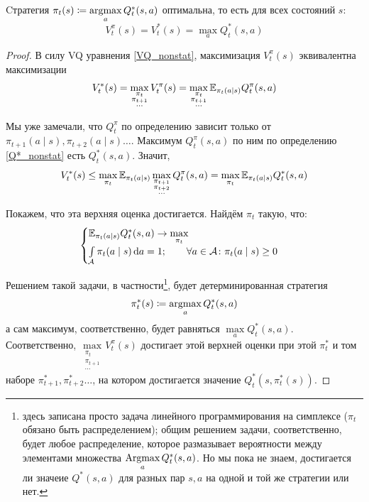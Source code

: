 \begin{theoremBox}[label=th:nonstatbellmancriterion]{}
Cтратегия $\pi_t(s) \coloneqq \mathop{\mathrm{argmax}}\limits_{a} Q^*_t(s, a)$ оптимальна, то есть для всех состояний $s$:
\begin{equation}\label{V*Q*_nonstat}
V^\pi_t(s) = V^*_t(s) = \max_{a} Q^*_t(s, a)
\end{equation}
\begin{proof}
В силу VQ уравнения \eqref{VQ_nonstat}, максимизация $V^{\pi}_t(s)$ эквивалентна максимизации
$$V^*_t(s) = \max_{\substack{\pi_t \\ \pi_{t+1} \\ \cdots}} V^\pi_t(s) = \max_{\substack{\pi_t \\ \pi_{t+1} \\ \cdots}} \mathbb{E}_{\pi_t(a \mid s)} Q^\pi_t(s, a)$$

Мы уже замечали, что $Q^\pi_t$ по определению зависит только от $\pi_{t+1}(a \mid s), \pi_{t+2}(a \mid s) \dots$. Максимум $Q^\pi_t(s, a)$ по ним по определению \eqref{Q*_nonstat} есть $Q^*_t(s, a)$. Значит,
$$V^*_t(s) \le \max_{\pi_t} \mathbb{E}_{\pi_t(a \mid s)} \max_{\substack{\pi_{t+1} \\ \pi_{t+2} \\ \cdots}} Q^\pi_t(s, a) = \max_{\pi_t} \mathbb{E}_{\pi_t(a \mid s)} Q^*_t(s, a)$$

Покажем, что эта верхняя оценка достигается. Найдём $\pi_t$ такую, что:
$$
\begin{cases}
\mathbb{E}_{\pi_t(a \mid s)} Q^*_t(s, a) \to \max\limits_{\pi_t} \\
\int\limits_{\mathcal{A}} \pi_t(a \mid s) \mathop{}\!\mathrm{d} a = 1; \qquad \forall a \in \mathcal{A} \colon \pi_t(a \mid s) \ge 0
\end{cases}
$$

Решением такой задачи, в частности\footnote{здесь записана просто задача линейного программирования на симплексе ($\pi_t$ обязано быть распределением); общим решением задачи, соответственно, будет любое распределение, которое размазывает вероятности между элементами множества $\mathop{\mathrm{Argmax}}\limits_{a} Q^*_t(s, a)$. Но мы пока не знаем, достигается ли значеие $Q^*(s, a)$ для разных пар $s, a$ на одной и той же стратегии или нет.}, будет детерминированная стратегия
$$\pi_t^*(s) \coloneqq \mathop{\mathrm{argmax}}_{a} Q^*_t(s, a)$$
а сам максимум, соответственно, будет равняться $\max\limits_{a} Q^*_t(s, a)$. Соответственно, $\max\limits_{\substack{\pi_t \\ \pi_{t+1} \\ \cdots}} V^\pi_t(s)$ достигает этой верхней оценки при этой $\pi^*_t$ и том наборе $\pi^*_{t+1}, \pi^*_{t+2} \dots$, на котором достигается значение $Q^*_t(s, \pi_t^*(s) )$.
\end{proof}
\end{theoremBox}

